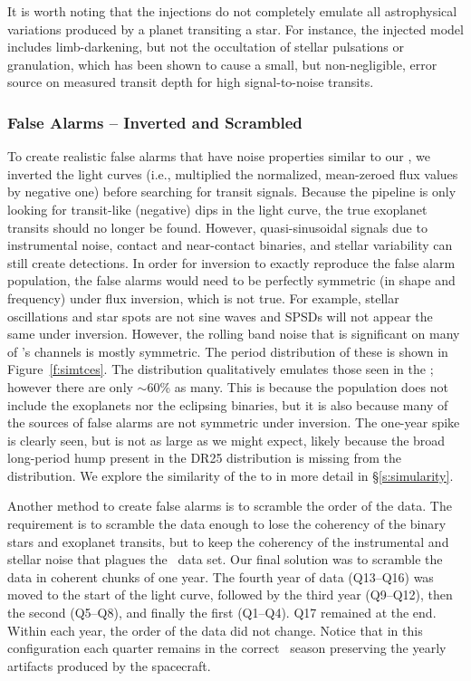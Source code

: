It is worth noting that the injections do not completely emulate all astrophysical variations produced by a planet transiting a star.  For instance, the injected model includes limb-darkening, but not the occultation of stellar pulsations or granulation, which has been shown to cause a small, but non-negligible, error source on measured transit depth \citep{Chiavassa2017} for high signal-to-noise transits.  


\subsubsection{False Alarms -- Inverted and Scrambled} 

To create realistic false alarms that have noise properties similar to our , we inverted the light curves (i.e., multiplied the normalized, mean-zeroed flux values by negative one) before searching for transit signals. Because the pipeline is only looking for transit-like (negative) dips in the light curve, the true exoplanet transits should no longer be found. However, quasi-sinusoidal signals due to instrumental noise, contact and near-contact binaries, and stellar variability can still create detections. In order for inversion to exactly reproduce the false alarm population, the false alarms would need to be perfectly symmetric (in shape and frequency) under flux inversion, which is not true. For example, stellar oscillations and star spots are not sine waves and SPSDs will not appear the same under inversion. However, the rolling band noise that is significant on many of \Kepler's channels is mostly symmetric.  The period distribution of these  is shown in Figure~\ref{f:simtces}. The distribution qualitatively emulates those seen in the ; however there are only $\sim$60\% as many.  This is because the population does not include the exoplanets nor the eclipsing binaries, but it is also because many of the sources of false alarms are not symmetric under inversion.  The one-year spike is clearly seen, but is not as large as we might expect, likely because the broad long-period hump present in the DR25 \opstce{} distribution is missing from the \invtce{} distribution. We explore the similarity of the  to  in more detail in \S\ref{s:simularity}.

Another method to create false alarms is to scramble the order of the data. The requirement is to scramble the data enough to lose the coherency of the binary stars and exoplanet transits, but to keep the coherency of the instrumental and stellar noise that plagues the \Kepler\ data set. Our final solution was to scramble the data in coherent chunks of one year. The fourth year of data (Q13--Q16) was moved to the start of the light curve, followed by the third year (Q9--Q12), then the second (Q5--Q8), and finally the first (Q1--Q4). Q17 remained at the end. Within each year, the order of the data did not change. Notice that in this configuration each quarter remains in the correct \Kepler\ season preserving the yearly artifacts produced by the spacecraft. 

